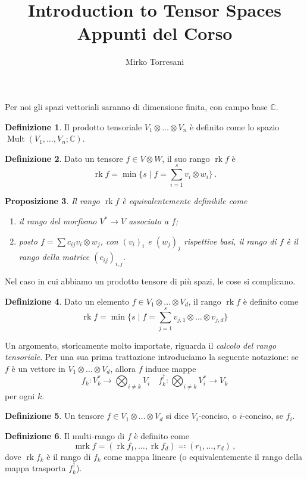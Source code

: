 \documentclass[a4paper, 11pt]{article}
\title{Introduction to Tensor Spaces\\ Appunti del Corso}
\author{Mirko Torresani}
\theoremstyle{definition}
\newtheorem{Def}{Definizione}
\theoremstyle{plain}
\newtheorem{Prop}[Def]{Proposizione}
\newcommand{\C}{\mathbb{C}}
\DeclareMathOperator{\Mult}{Mult}
\DeclareMathOperator{\rk}{rk}
\DeclareMathOperator{\mrk}{mrk}
\begin{document}
	\maketitle
	
Per noi gli spazi vettoriali saranno di dimensione finita, con campo base $\C$. 
\begin{Def}
	Il prodotto tensoriale $V_1 \otimes \dots \otimes V_n$ è definito come lo spazio $\Mult(V_1, \dots, V_n;\C)$.
\end{Def}

\begin{Def}
	Dato un tensore $f \in V \otimes W$, il suo rango $\rk f$ è 
	\[
		\rk f = \min\{s \mid f = \sum_{i = 1}^s v_i \otimes w_i\}\,.
	\]
\end{Def}
\begin{Prop}
	Il rango $\rk f$ è equivalentemente definibile come
	\begin{enumerate}
		\item il rango del morfismo $V^* \to V$ associato a $f$;
		\item posto $f = \sum c_{ij} v_i \otimes w_j$, con $(v_i)_i$ e $(w_j)_j$ rispettive basi, il rango di $f$ è il rango della matrice $(c_{ij})_{i,j}$.
	\end{enumerate}
\end{Prop}

Nel caso in cui abbiamo un prodotto tensore di più spazi, le cose si complicano.
\begin{Def}
	Dato un elemento $f \in V_1\otimes \dots\otimes V_d$, il rango $\rk f$ è definito come
	\[
		\rk f = \min\{s \mid f = \sum_{j = 1}^s v_{j,1} \otimes \dots \otimes  v_{j,d}\}
	\]
\end{Def}

Un argomento, storicamente molto importate, riguarda il \emph{calcolo del rango tensoriale}. Per una sua prima trattazione introduciamo la seguente notazione: se $f$ è un vettore in $V_1 \otimes \dots \otimes V_d$, allora $f$ induce mappe 
\[
	f_k \colon V_k^\ast \to \bigotimes_{i \neq k} V_i \quad f_k^\dagger \colon \bigotimes_{i \neq k} V_i^* \to V_k
\]
per ogni $k$.
\begin{Def}
	Un tensore $f \in V_1 \otimes \dots \otimes V_d$ si dice $V_i$-conciso, o $i$-conciso, se $f_i$.
\end{Def}
\begin{Def}
	Il multi-rango di $f$ è definito come
	\[
		\mrk f = (\rk f_1, \dots, \rk f_d) \eqqcolon (r_1, \dots, r_d) \,,
	\]
	dove $\rk f_k$ è il rango di $f_k$ come mappa lineare (o equivalentemente il rango della mappa trasporta $f_k^\dagger$).
\end{Def}
\end{document}
